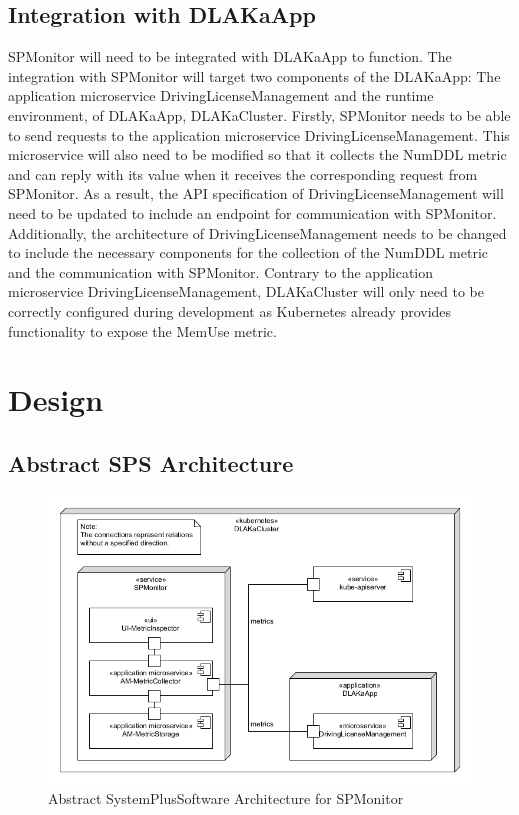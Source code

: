 \subsection{Integration with DLAKaApp}
SPMonitor will need to be integrated with DLAKaApp to function.
The integration with SPMonitor will target two components of the DLAKaApp:
The application microservice DrivingLicenseManagement and the runtime environment, of DLAKaApp, DLAKaCluster.
Firstly, SPMonitor needs to be able to send requests to the application microservice DrivingLicenseManagement.
This microservice will also need to be modified so that it collects the NumDDL metric and can reply
with its value when it receives the corresponding request from SPMonitor.
As a result, the API specification of DrivingLicenseManagement will need to be updated to include
an endpoint for communication with SPMonitor. Additionally, the architecture of DrivingLicenseManagement
needs to be changed to include the necessary components for the collection of the NumDDL metric
and the communication with SPMonitor.
Contrary to the application microservice DrivingLicenseManagement, DLAKaCluster will only
need to be correctly configured during development as Kubernetes already provides functionality
to expose the MemUse metric.

\section{Design}


\subsection{Abstract SPS Architecture}

\begin{figure}[h]
	\centering
	\includegraphics[width=\textwidth]{figures/abstract_sps_spmonitor.png}
	\caption{Abstract SystemPlusSoftware Architecture for SPMonitor}
	\label{fig:abstract_sps_spmonitor}
\end{figure}

